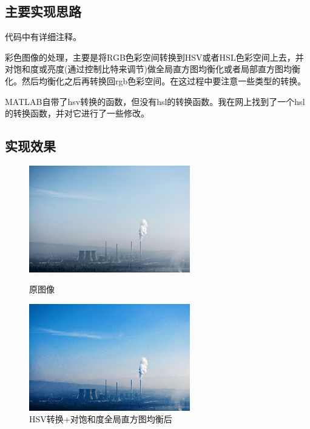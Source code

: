 \documentclass[11pt, a4paper, UTF8]{ctexart}
\begin{document}
\subsection{主要实现思路}
代码中有详细注释。\par
彩色图像的处理，主要是将RGB色彩空间转换到HSV或者HSL色彩空间上去，并对饱和度或亮度(通过控制比特来调节)做全局直方图均衡化或者局部直方图均衡化。然后均衡化之后再转换回rgb色彩空间。在这过程中要注意一些类型的转换。\par
MATLAB自带了hsv转换的函数，但没有hsl的转换函数。我在网上找到了一个hsl的转换函数，并对它进行了一些修改。\par




\subsection{实现效果}

\begin{figure}[H]
  \centering
  \begin{minipage}[t]{0.48\textwidth}
  \centering
  \includegraphics[width=7cm]{color.jpg}
  \caption{原图像}
  \end{minipage}
  \begin{minipage}[t]{0.48\textwidth}
  \centering
  \includegraphics[width=7cm]{color_hsv_s_global_converted.jpg}
  \caption{HSV转换+对饱和度全局直方图均衡后}
  \end{minipage}
\end{figure}
\end{document}
